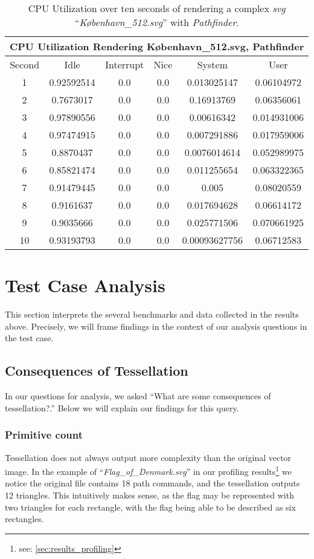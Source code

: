 \begin{table}[H]
\centering
\begin{tabular}{ |c|c|c|c|c|c| }
\hline
\multicolumn{6}{|c|}{CPU Utilization Rendering København\_512.svg, Pathfinder}\\
\hline
Second&Idle&Interrupt&Nice&System&User\\
\hline
1&0.92592514&0.0&0.0&0.013025147&0.06104972\\
\hline
2&0.7673017&0.0&0.0&0.16913769&0.06356061\\
\hline
3&0.97890556&0.0&0.0&0.00616342&0.014931006\\
\hline
4&0.97474915&0.0&0.0&0.007291886&0.017959006\\
\hline
5&0.8870437&0.0&0.0&0.0076014614&0.052989975\\
\hline
6&0.85821474&0.0&0.0&0.011255654&0.063322365\\
\hline
7&0.91479445&0.0&0.0&0.005&0.08020559\\
\hline
8&0.9161637&0.0&0.0&0.017694628&0.06614172\\
\hline
9&0.9035666&0.0&0.0&0.025771506&0.070661925\\
\hline
10&0.93193793&0.0&0.0&0.00093627756&0.06712583\\
\hline
\end{tabular}
\caption{CPU Utilization over ten seconds of rendering a complex \textit{svg} ``\textit{København\_512.svg}'' with \textit{Pathfinder}.\label{tab:wet_map_pathfinder}}
\end{table}




\section{Test Case Analysis}
This section interprets the several benchmarks and data collected in the results above. Precisely, we will frame findings in the context of our analysis questions in the test case.\medskip

\subsection{Consequences of Tessellation}
In our questions for analysis, we asked ``What are some consequences of tessellation?.'' Below we will explain our findings for this query.\medskip

\subsubsection{Primitive count} Tessellation does not always output more complexity than the original vector image. In the example of ``\textit{Flag\_of\_Denmark.svg}'' in our profiling results\footnote{see: \cref{sec:results_profiling}} we notice the original file contains 18 path commands, and the tessellation outputs 12 triangles. This intuitively makes sense, as the flag may be represented with two triangles for each rectangle, with the flag being able to be described as six rectangles.

